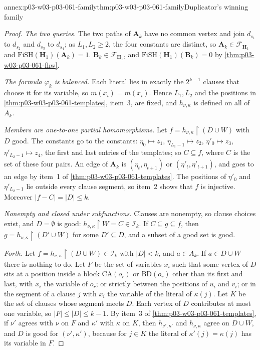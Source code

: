 \begin{annexitem}{annex:p03-w03-p03-061-family}{thm:p03-w03-p03-061-family}{Duplicator's winning family}
\begin{proof}
\emph{The two queries.} The two paths of \(\mathbf A_k\) have no common
vertex and join \(d_{s_1}\) to \(d_{s_2}\) and \(d_{s_3}\) to \(d_{s_4}\); as
\(L_1,L_2\ge2\), the four constants are distinct, so \(\mathbf A_k\in
\mathcal F_{\mathbf H_1}\) and \(\mathrm{FiSH}(\mathbf H_1)(\mathbf A_k)=1\).
\(\mathbf B_k\in\mathcal F_{\mathbf H_1}\), and
\(\mathrm{FiSH}(\mathbf H_1)(\mathbf B_k)=0\) by
\cref{thm:p03-w03-p03-061-fhw}.

\emph{The formula \(\varphi_k\) is balanced.} Each literal lies in exactly
the \(2^{k-1}\) clauses that choose it for its variable, so
\(m(x_i)=m(\bar x_i)\). Hence \(L_1,L_2\) and the positions in
\cref{thm:p03-w03-p03-061-templates}, item~3, are fixed, and
\(h_{\nu,\kappa}\) is defined on all of \(A_k\).

\emph{Members are one-to-one partial homomorphisms.} Let
\(f=h_{\nu,\kappa}\restriction(D\cup W)\) with \(D\) good. The constants go
to the constants: \(\eta_0\mapsto z_1\), \(\eta_{L_1-1}\mapsto z_2\),
\(\eta'_0\mapsto z_3\), \(\eta'_{L_2-1}\mapsto z_4\), the first and last
entries of the templates; so \(C\subseteq f\), where \(C\) is the set of these
four pairs. An edge of \(\mathbf A_k\) is \((\eta_t,\eta_{t+1})\) or
\((\eta'_t,\eta'_{t+1})\), and goes to an edge by item~1 of
\cref{thm:p03-w03-p03-061-templates}. The positions of \(\eta'_0\) and
\(\eta'_{L_2-1}\) lie outside every clause segment, so item~2 shows that
\(f\) is injective. Moreover \(|f-C|=|D|\le k\).

\emph{Nonempty and closed under subfunctions.} Clauses are nonempty, so
clause choices exist, and \(D=\emptyset\) is good: \(h_{\nu,\kappa}
\restriction W=C\in\mathcal I_k\). If \(C\subseteq g\subseteq f\), then
\(g=h_{\nu,\kappa}\restriction(D'\cup W)\) for some \(D'\subseteq D\), and a
subset of a good set is good.

\emph{Forth.} Let \(f=h_{\nu,\kappa}\restriction(D\cup W)\in\mathcal I_k\)
with \(|D|<k\), and \(a\in A_k\). If \(a\in D\cup W\) there is nothing to
do. Let \(F\) be the set of variables \(x_i\) such that some vertex of \(D\)
sits at a position inside a block \(\mathrm{CA}(o_r)\) or \(\mathrm{BD}(o_r)\)
other than its first and last, with \(x_i\) the variable of \(o_r\); or
strictly between the positions of \(u_i\) and \(v_i\); or in the segment of a
clause \(j\) with \(x_i\) the variable of the literal of \(\kappa(j)\). Let
\(K\) be the set of clauses whose segment meets \(D\). Each vertex of \(D\)
contributes at most one variable, so \(|F|\le|D|\le k-1\). By item~3 of
\cref{thm:p03-w03-p03-061-templates}, if \(\nu'\) agrees with \(\nu\) on
\(F\) and \(\kappa'\) with \(\kappa\) on \(K\), then \(h_{\nu',\kappa'}\) and
\(h_{\nu,\kappa}\) agree on \(D\cup W\), and \(D\) is good for
\((\nu',\kappa')\), because for \(j\in K\) the literal of
\(\kappa'(j)=\kappa(j)\) has its variable in \(F\).


\end{proof}
\end{annexitem}
